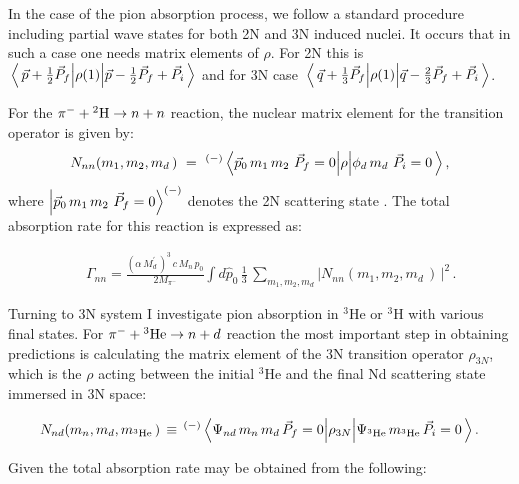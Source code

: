     In the case of the pion absorption process, we follow a standard procedure
    including partial wave states for both 2N and 3N induced nuclei.
    It occurs that in such a case one needs  matrix elements of $\rho$. 
    For 2N this is 
    $ \matrixel{\, \vec{p} + \frac12\vec{P}_f } 
    {\rho (1) }{ \vec{p} - \frac12\vec{P}_f + \vec{P}_i \, }$
    and for 3N case
    $\matrixel {\, \vec{q} + \frac13\vec{P}_f}  
    {\rho(1)} {\vec{q} - \frac23\vec{P}_f + \vec{P}_i \,}$.

    For the $\pi^- + {^2{\rm H}} \rightarrow n + n $ reaction,
    the nuclear matrix element for the transition operator is given by:
    \begin{eqnarray}
        N_{nn} (m_1, m_2, m_d \, ) \ = \
   ^{(-)}\matrixel{ \vec{p}_0 \, m_{1} \, m_2 \ \vec{P}_f=0 } 
   {\rho } {\phi_d \, m_d \ \vec{P}_i=0 \, },
   \label{nnn1}
   \end{eqnarray}
   where $ \ket{  \vec{p}_0 \, m_{1} \, m_2 \ \vec{P}_f=0  }^{(-)}  $ denotes the 2N scattering state \cite{Golak2018}.
   The total absorption rate for this reaction is expressed as:

   \begin{eqnarray}
        &&\Gamma_{nn} = 
    \frac{ \left( \alpha \, M^\prime_d \, \right)^3 \, c \, M_n \, p_0 }{ 2 M_{\pi^-} }
        \int d \hat{p}_0 \,
        \frac13 \, 
        \sum\limits_{m_1, m_2, m_d} 
        \left| 
        N_{nn} (m_1, m_2, m_d \, ) \, 
        \right|^2  \, .
    \label{gnn1}
    \end{eqnarray} 

    Turning to 3N system I investigate pion absorption in $^3$He or $^3$H
    with various final states.
    For $\pi^- + {^3{\rm He}} \rightarrow n + d $ reaction the most important step in 
    obtaining predictions is calculating
    the matrix element
    of the 3N transition operator $\rho_{3N}$,
     which is the $\rho$ acting between the initial $^3$He and the final Nd scattering state immersed in 3N space:

    \begin{eqnarray}  
        N_{nd} (m_n, m_d , m_{^3{\rm He}}  \, )  \, \equiv \, 
        {}^{(-)}\matrixel{\Psi_{nd}  \, 
            m_n \, m_d \,
            \vec{P}_f=0 
            } {\rho_{3N} }
        {\Psi_{^3{\rm He}} \, m_{^3{\rm He}} \, \vec{P}_i=0 \, }.
        \label{nnd}
    \end{eqnarray}

    Given  the total absorption 
    rate may be obtained from the following:

